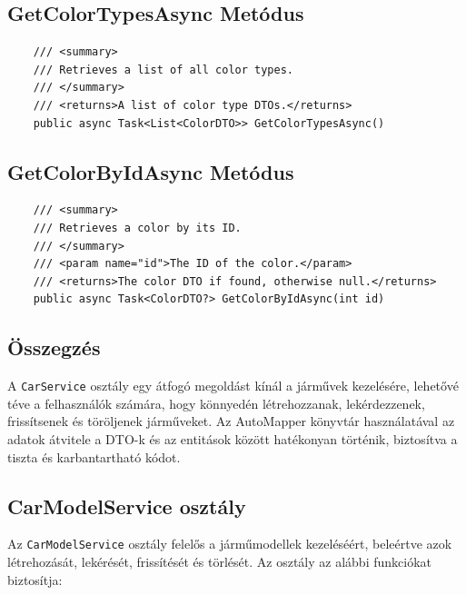 \documentclass{report}[11pt]
\begin{document}
\subsection*{GetColorTypesAsync Metódus}
\begin{lstlisting}
    /// <summary>
    /// Retrieves a list of all color types.
    /// </summary>
    /// <returns>A list of color type DTOs.</returns>
    public async Task<List<ColorDTO>> GetColorTypesAsync()
\end{lstlisting}

\subsection*{GetColorByIdAsync Metódus}
\begin{lstlisting}
    /// <summary>
    /// Retrieves a color by its ID.
    /// </summary>
    /// <param name="id">The ID of the color.</param>
    /// <returns>The color DTO if found, otherwise null.</returns>
    public async Task<ColorDTO?> GetColorByIdAsync(int id)
\end{lstlisting}
\subsection*{Összegzés}
A \texttt{CarService} osztály egy átfogó megoldást kínál a járművek kezelésére, lehetővé téve a felhasználók számára, hogy könnyedén létrehozzanak, lekérdezzenek, frissítsenek és töröljenek járműveket. Az AutoMapper könyvtár használatával az adatok átvitele a DTO-k és az entitások között hatékonyan történik, biztosítva a tiszta és karbantartható kódot.

\subsection{CarModelService osztály}

Az \texttt{CarModelService} osztály felelős a járműmodellek kezeléséért, beleértve azok létrehozását, lekérését, frissítését és törlését. Az osztály az alábbi funkciókat biztosítja:
\end{document}
